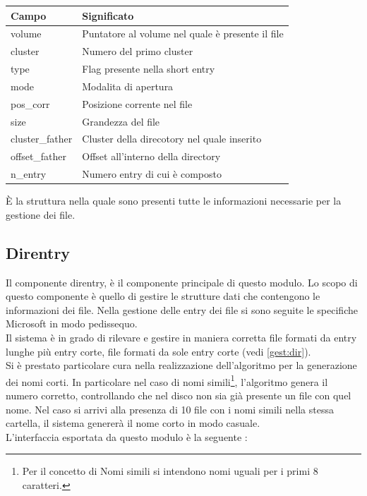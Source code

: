 \begin{center}
\begin{tabular}{|l|l|}\hline
\textbf{Campo} & \textbf{Significato}\\\hline
volume & Puntatore al volume nel quale è presente il file\\\hline
cluster & Numero del primo cluster\\\hline
type & Flag presente nella short entry\\\hline
mode & Modalita di apertura\\\hline
pos\_corr & Posizione corrente nel file\\\hline
size & Grandezza del file\\\hline
cluster\_father & Cluster della direcotory nel quale inserito\\\hline
offset\_father & Offset all'interno della directory\\\hline
n\_entry & Numero entry di cui è composto\\\hline
\end{tabular}
\end{center}

È la struttura nella quale sono presenti tutte le informazioni necessarie per la gestione dei file. \\

  \subsection{Direntry}
    Il componente direntry, è il componente principale di questo modulo. Lo scopo di questo componente è quello di gestire le strutture dati che contengono le informazioni dei file. 
    Nella gestione delle entry dei file si sono seguite le specifiche Microsoft in modo pedissequo. \\
    Il sistema è in grado di rilevare e gestire in maniera corretta file formati da entry lunghe più entry corte, file formati da sole entry corte (vedi \ref{gest:dir}). \\
    Si è prestato particolare cura nella realizzazione dell'algoritmo per la generazione dei nomi corti. In particolare nel caso di nomi simili\footnote{Per il concetto di Nomi simili si intendono nomi uguali per i primi 8 caratteri.},
   l'algoritmo genera il numero corretto, controllando che nel disco non sia già presente un file con quel nome. Nel caso si arrivi alla presenza di 10 file con i nomi simili nella stessa cartella, il sistema 
   genererà il nome corto in modo casuale. \\
  L'interfaccia esportata da questo modulo è la seguente : 


